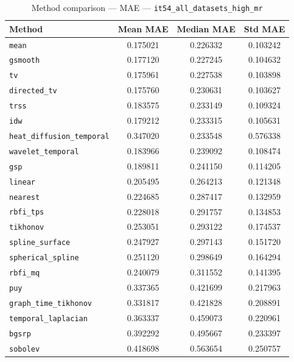 \begin{table}[ht]
\centering
\caption{Method comparison — MAE — \texttt{it54_all_datasets_high_mr}}
\label{tab:mae_it54_all_datasets_high_mr}
\begin{tabular}{lccc}
\hline
Method & Mean MAE & Median MAE & Std MAE \\
\hline
\texttt{mean} & 0.175021 & 0.226332 & 0.103242 \\
\texttt{gsmooth} & 0.177120 & 0.227245 & 0.104632 \\
\texttt{tv} & 0.175961 & 0.227538 & 0.103898 \\
\texttt{directed_tv} & 0.175760 & 0.230631 & 0.103627 \\
\texttt{trss} & 0.183575 & 0.233149 & 0.109324 \\
\texttt{idw} & 0.179212 & 0.233315 & 0.105631 \\
\texttt{heat_diffusion_temporal} & 0.347020 & 0.233548 & 0.576338 \\
\texttt{wavelet_temporal} & 0.183966 & 0.239092 & 0.108474 \\
\texttt{gsp} & 0.189811 & 0.241150 & 0.114205 \\
\texttt{linear} & 0.205495 & 0.264213 & 0.121348 \\
\texttt{nearest} & 0.224685 & 0.287417 & 0.132959 \\
\texttt{rbfi_tps} & 0.228018 & 0.291757 & 0.134853 \\
\texttt{tikhonov} & 0.253051 & 0.293122 & 0.174537 \\
\texttt{spline_surface} & 0.247927 & 0.297143 & 0.151720 \\
\texttt{spherical_spline} & 0.251120 & 0.298649 & 0.164294 \\
\texttt{rbfi_mq} & 0.240079 & 0.311552 & 0.141395 \\
\texttt{puy} & 0.337365 & 0.421699 & 0.217963 \\
\texttt{graph_time_tikhonov} & 0.331817 & 0.421828 & 0.208891 \\
\texttt{temporal_laplacian} & 0.363337 & 0.459073 & 0.220961 \\
\texttt{bgsrp} & 0.392292 & 0.495667 & 0.233397 \\
\texttt{sobolev} & 0.418698 & 0.563654 & 0.250757 \\
\hline
\end{tabular}
\end{table}
